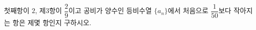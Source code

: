 첫째항이 $2$, 제$3$항이 $\dfrac{2}{9}$이고 공비가 양수인 등비수열 $\{a_n\}$에서 처음으로 $\dfrac{1}{50}$보다 작아지는 항은 제몇 항인지 구하시오.
